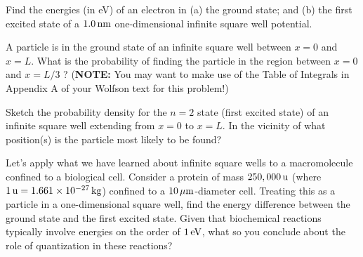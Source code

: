 \begin{problem}
Find the energies (in eV) of an electron in (a) the ground
state; and (b) the first excited state of a $1.0 \,\mbox{nm}$ one-dimensional
infinite square well potential.
\label{prob:QuantumWire}
\end{problem}


\begin{problem}
A particle is in the ground state of an infinite square well between $x = 0$
and $x = L$.  What is the
probability of finding the particle in the region between $x=0$ and $x=
L/3$ ?  ({\bf NOTE:} You may want to make use of the Table of Integrals
in Appendix A of your Wolfson text for this problem!) 
\end{problem}



\begin{problem}
Sketch the probability density for the $n=2$ state (first excited state)
of an infinite square well
extending from $x=0$ to $x=L$. In the vicinity of what position(s) is 
the particle most likely to be found?
\label{prob:WhereInPInBox}
\end{problem}



\begin{problem}

Let's apply what we have learned about infinite square wells to a
macromolecule confined to a biological cell.  Consider a protein of mass
$250,000 \,\mbox{u}$ (where $1\,\mbox{u} = 1.661 \times 10^{-27}\,\mbox{kg}$)
confined to a $10 \,\mbox{$\mu$m}$-diameter cell.  Treating this as a
particle in a one-dimensional square well, find the energy difference
between the ground state and the first excited state.  Given that
biochemical reactions typically involve energies on the order of 
$1\,\mbox{eV}$, what so you conclude about the role of quantization in
these reactions?

\end{problem}

